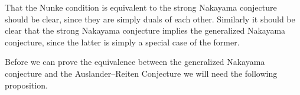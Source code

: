 %
%
%

That the Nunke condition is equivalent to the strong Nakayama conjecture should be clear, since they are simply duals of each other. Similarly it should be clear that the strong Nakayama conjecture implies the generalized Nakayama conjecture, since the latter is simply a special case of the former.

Before we can prove the equivalence between the generalized Nakayama conjecture and the Auslander--Reiten Conjecture we will need the following proposition.

